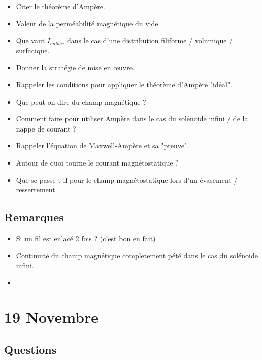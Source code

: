 \documentclass[a4paper, 11pt, hidelinks]{article}
\begin{document}
\begin{itemize}
    \item Citer le théorème d'Ampère. \cite{Chapitre11}
    \item Valeur de la perméabilité magnétique du vide. \cite{Chapitre11}
    \item Que vaut $I_{enlace}$ dans le cas d'une distribution filiforme / volumique / surfacique. \cite{Chapitre11}
    \item Donner la stratégie de mise en \oe uvre. \cite{Chapitre11}
    \item Rappeler les conditions pour appliquer le théorème d'Ampère "idéal". \cite{Chapitre11}
    \item Que peut-on dire du champ magnétique ? \cite{Chapitre11}
    \item Comment faire pour utiliser Ampère dans le cas du solénoide infini / de la nappe de courant ? \cite{Chapitre11}
    \item Rappeler l'équation de Maxwell-Ampère et sa "preuve". \cite{Chapitre11}
    \item Autour de quoi tourne le courant magnétostatique ? \cite{Chapitre11}
    \item Que se passe-t-il pour le champ magnétostatique lors d'un évasement / resserrement. \cite{Chapitre11}
\end{itemize}



\subsection{Remarques}


\begin{itemize}
    \item Si un fil est enlacé 2 fois ? (c'est bon en fait)
    \item Continuité du champ magnétique completement pété dans le cas du solénoide infini.
    \item 
\end{itemize}




\section{19 Novembre}

\subsection{Questions}
\end{document}
